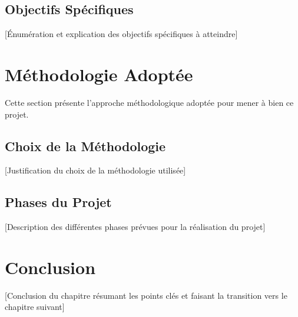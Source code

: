 \subsection{Objectifs Spécifiques}
[Énumération et explication des objectifs spécifiques à atteindre]

\section{Méthodologie Adoptée}
Cette section présente l'approche méthodologique adoptée pour mener à bien ce projet.

\subsection{Choix de la Méthodologie}
[Justification du choix de la méthodologie utilisée]

\subsection{Phases du Projet}
[Description des différentes phases prévues pour la réalisation du projet]

\section{Conclusion}
[Conclusion du chapitre résumant les points clés et faisant la transition vers le chapitre suivant]
